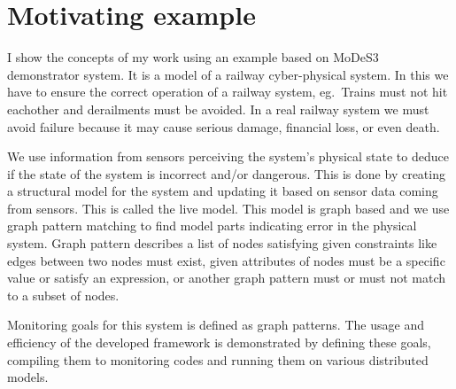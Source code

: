 \chapter{Motivating example}


I show the concepts of my work using an example based on MoDeS3~\cite{modes3} demonstrator system. It is a model of a railway cyber-physical system. In this we have to ensure the correct operation of a railway system, eg.\ Trains must not hit eachother and derailments must be avoided. In a real railway system we must avoid failure because it may cause serious damage, financial loss, or even death.

We use information from sensors perceiving the system's physical state to deduce if the state of the system is incorrect and/or dangerous. This is done by creating a structural model for the system and updating it based on sensor data coming from sensors. This is called the live model. This model is graph based and we use graph pattern matching to find model parts indicating error in the physical system. Graph pattern describes a list of nodes satisfying given constraints like edges between two nodes must exist, given attributes of nodes must be a specific value or satisfy an expression, or another graph pattern must or must not match to a subset of nodes.

Monitoring goals for this system is defined as graph patterns. The usage and efficiency of the developed framework is demonstrated by defining these goals, compiling them to monitoring codes and running them on various distributed models.

 



